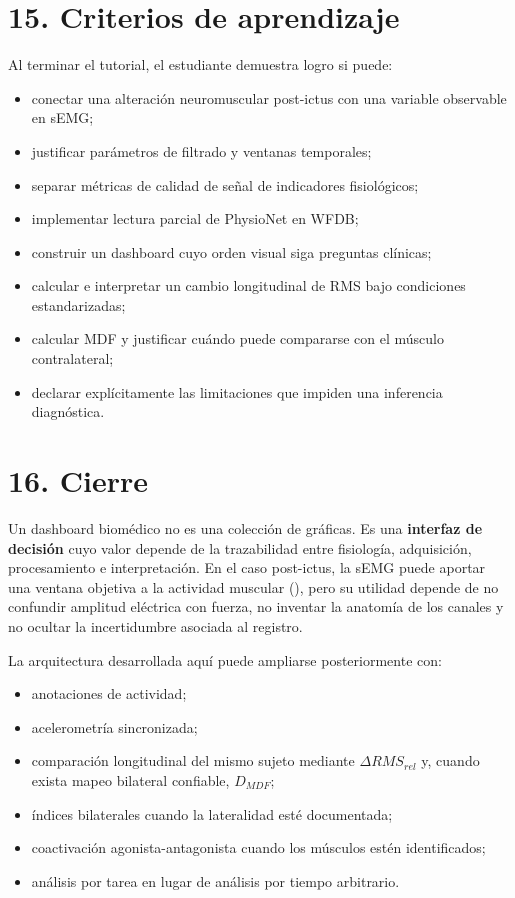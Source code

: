 \documentclass[
  spanish,
  a4paper,
  DIV=11,
  numbers=noendperiod]{scrreprt}
\providecommand{\tightlist}{%
  \setlength{\itemsep}{0pt}\setlength{\parskip}{0pt}}
\begin{document}
\chapter{15. Criterios de aprendizaje}\label{criterios-de-aprendizaje}

Al terminar el tutorial, el estudiante demuestra logro si puede:

\begin{itemize}
\tightlist
\item
  conectar una alteración neuromuscular post-ictus con una variable
  observable en sEMG;
\item
  justificar parámetros de filtrado y ventanas temporales;
\item
  separar métricas de calidad de señal de indicadores fisiológicos;
\item
  implementar lectura parcial de PhysioNet en WFDB;
\item
  construir un dashboard cuyo orden visual siga preguntas clínicas;
\item
  calcular e interpretar un cambio longitudinal de RMS bajo condiciones
  estandarizadas;
\item
  calcular MDF y justificar cuándo puede compararse con el músculo
  contralateral;
\item
  declarar explícitamente las limitaciones que impiden una inferencia
  diagnóstica.
\end{itemize}

\chapter{16. Cierre}\label{cierre}

Un dashboard biomédico no es una colección de gráficas. Es una
\textbf{interfaz de decisión} cuyo valor depende de la trazabilidad
entre fisiología, adquisición, procesamiento e interpretación. En el
caso post-ictus, la sEMG puede aportar una ventana objetiva a la
actividad muscular (), pero su utilidad depende de no confundir amplitud eléctrica con
fuerza, no inventar la anatomía de los canales y no ocultar la
incertidumbre asociada al registro.

La arquitectura desarrollada aquí puede ampliarse posteriormente con:

\begin{itemize}
\tightlist
\item
  anotaciones de actividad;
\item
  acelerometría sincronizada;
\item
  comparación longitudinal del mismo sujeto mediante
  \(\Delta RMS_{rel}\) y, cuando exista mapeo bilateral confiable,
  \(D_{MDF}\);
\item
  índices bilaterales cuando la lateralidad esté documentada;
\item
  coactivación agonista-antagonista cuando los músculos estén
  identificados;
\item
  análisis por tarea en lugar de análisis por tiempo arbitrario.
\end{itemize}
\end{document}
